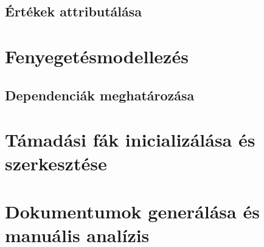 \subsection{Értékek attributálása}

\section{Fenyegetésmodellezés}

\subsection{Dependenciák meghatározása}

\section{Támadási fák inicializálása és szerkesztése}

\section{Dokumentumok generálása és manuális analízis}